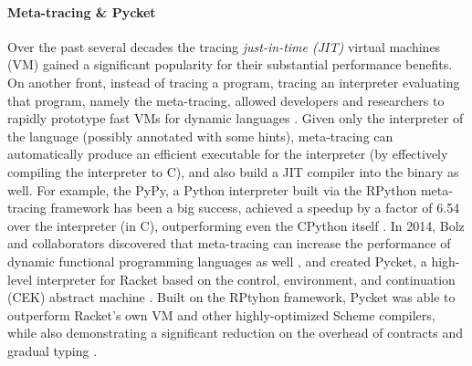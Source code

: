 \label{subsec:meta-trace}

\vspace{-0.2cm}

\paragraph{Meta-tracing \& Pycket} Over the past several decades the tracing \emph{just-in-time (JIT)}
virtual machines (VM) gained a significant popularity for their
substantial performance benefits. On another front, instead of tracing
a program, tracing an interpreter evaluating that program, namely the
meta-tracing, allowed developers and researchers to rapidly prototype
fast VMs for dynamic languages \cite{bolz09}. Given only the
interpreter of the language (possibly annotated with some hints),
meta-tracing can automatically produce an efficient executable for the
interpreter (by effectively compiling the interpreter to C), and also
build a JIT compiler into the binary as well. For example, the PyPy, a
Python interpreter built via the RPython meta-tracing framework has
been a big success, achieved a speedup by a factor of 6.54 over the
interpreter (in C), outperforming even the CPython itself
\cite{bolz09}. In 2014, Bolz and collaborators discovered that
meta-tracing can increase the performance of dynamic functional
programming languages as well \cite{bolz14-racket}, and created
Pycket, a high-level interpreter for Racket based on the control,
environment, and continuation (CEK) abstract machine
\cite{felleisen87}. Built on the RPtyhon framework, Pycket was able to
outperform Racket's own VM and other highly-optimized Scheme
compilers, while also demonstrating a significant reduction on the
overhead of contracts and gradual typing \cite{pycket15,pycket17}.
